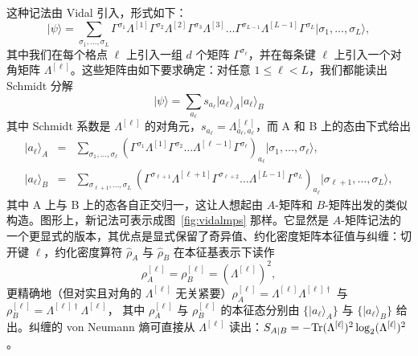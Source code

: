 \documentclass[a4paper,10pt,oneside,onecolumn,1p,times]{elsarticle}
\newcommand{\tr}{{\rm Tr }}
\newcommand{\ket}[1]{\mbox{$| #1  \rangle$}}
\begin{document}
这种记法由 Vidal\cite{Vidal03a} 引入，形式如下：
\begin{equation}
\ket{\psi} = \sum_{\sigma_1,\ldots,\sigma_L} \Gamma^{\sigma_1} \Lambda^{[1]}  \Gamma^{\sigma_2} \Lambda^{[2]}  \Gamma^{\sigma_3} \Lambda^{[3]} \ldots  \Gamma^{\sigma_{L-1}} \Lambda^{[L-1]}  \Gamma^{\sigma_L} \ket{\sigma_1,\ldots,\sigma_L} ,
\label{eq:canonicalform}
\end{equation} 
其中我们在每个格点 $\ell$ 上引入一组 $d$ 个矩阵 $\Gamma^{\sigma_\ell}$，并在每条键 $\ell$ 上引入一个对角矩阵 $\Lambda^{[\ell]}$。这些矩阵由如下要求确定：对任意 $1\leq \ell < L$，我们都能读出 Schmidt 分解
\begin{equation}
\ket{\psi} = \sum_{a_\ell} s_{a_\ell} \ket{a_\ell}_A \ket{a_\ell}_B
\end{equation}
其中 Schmidt 系数是 $\Lambda^{[\ell]}$ 的对角元，$s_{a_\ell} = \Lambda^{[\ell]}_{a_\ell,a_\ell}$，而 A 和 B 上的态由下式给出
\begin{eqnarray}
\ket{a_\ell}_A &=& \sum_{\sigma_1,\ldots,\sigma_\ell}
 (\Gamma^{\sigma_1}\Lambda^{[1]}\Gamma^{\sigma_2} \ldots \Lambda^{[\ell-1]} \Gamma^{\sigma_\ell})_{a_{\ell}}
\ket{\sigma_1,\ldots,\sigma_\ell}, \\
\ket{a_\ell}_B &=& \sum_{\sigma_{\ell+1},\ldots,\sigma_L} 
(\Gamma^{\sigma_{\ell+1}}\Lambda^{[\ell+1]}\Gamma^{\sigma_{\ell+2}} \ldots \Lambda^{[L-1]} \Gamma^{\sigma_L})_{a_\ell}
\ket{\sigma_{\ell+1},\ldots,\sigma_L},
\end{eqnarray}
其中 A 上与 B 上的态各自正交归一，这让人想起由 $A$-矩阵和 $B$-矩阵出发的类似构造。图形上，新记法可表示成图~\ref{fig:vidalmps} 那样。它显然是 $A$-矩阵记法的一个更显式的版本，其优点是显式保留了奇异值、约化密度矩阵本征值与纠缠：切开键 $\ell$，约化密度算符 $\hat{\rho}_A$ 与 $\hat{\rho}_B$ 在本征基表示下读作
\begin{equation}
\rho_A^{[\ell]} = \rho_B^{[\ell]} = (\Lambda^{[\ell]})^2 ,
\end{equation}
更精确地（但对实且对角的 $\Lambda^{[\ell]}$ 无关紧要）$\rho_A^{[\ell]} = \Lambda^{[\ell]}\Lambda^{[\ell]\dagger}$ 与 $\rho_B^{[\ell]} = \Lambda^{[\ell]\dagger}\Lambda^{[\ell]}$，
其中 $\rho_A^{[\ell]}$ 与 $\rho_B^{[\ell]}$ 的本征态分别由 $\{ \ket{a_\ell}_A \}$ 与 $\{ \ket{a_\ell}_B \}$ 给出。纠缠的 von Neumann 熵可直接从 $\Lambda^{[\ell]}$ 读出：$S_{A|B} = -\tr (\Lambda^{[\ell]})^2 \log_2 (\Lambda^{[\ell]})^2$。
\end{document}
